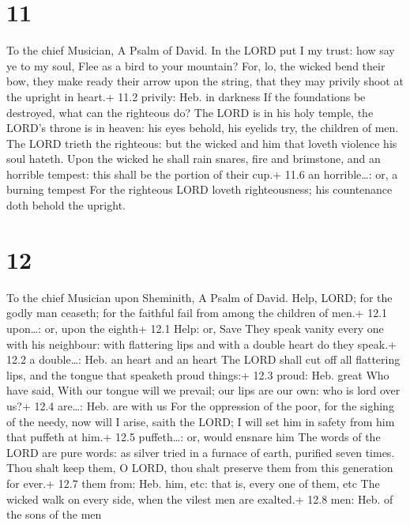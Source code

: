 \hypertarget{section-10}{%
\section{11}\label{section-10}}

To the chief Musician, A Psalm of David.  In the LORD put I
my trust: how say ye to my soul, Flee as a bird to your mountain?
 For, lo, the wicked bend their bow, they make ready their
arrow upon the string, that they may privily shoot at the upright in
heart.+ 11.2 privily: Heb. in darkness  If the foundations
be destroyed, what can the righteous do?  The LORD is in his
holy temple, the LORD's throne is in heaven: his eyes behold, his
eyelids try, the children of men.  The LORD trieth the
righteous: but the wicked and him that loveth violence his soul hateth.
 Upon the wicked he shall rain snares, fire and brimstone,
and an horrible tempest: this shall be the portion of their cup.+ 11.6
an horrible\ldots: or, a burning tempest  For the righteous
LORD loveth righteousness; his countenance doth behold the upright.

\hypertarget{section-11}{%
\section{12}\label{section-11}}

To the chief Musician upon Sheminith, A Psalm of David. 
Help, LORD; for the godly man ceaseth; for the faithful fail from among
the children of men.+ 12.1 upon\ldots: or, upon the eighth+ 12.1 Help:
or, Save  They speak vanity every one with his neighbour:
with flattering lips and with a double heart do they speak.+ 12.2 a
double\ldots: Heb. an heart and an heart  The LORD shall cut
off all flattering lips, and the tongue that speaketh proud things:+
12.3 proud: Heb. great  Who have said, With our tongue will
we prevail; our lips are our own: who is lord over us?+ 12.4 are\ldots:
Heb. are with us  For the oppression of the poor, for the
sighing of the needy, now will I arise, saith the LORD; I will set him
in safety from him that puffeth at him.+ 12.5 puffeth\ldots: or, would
ensnare him  The words of the LORD are pure words: as silver
tried in a furnace of earth, purified seven times.  Thou
shalt keep them, O LORD, thou shalt preserve them from this generation
for ever.+ 12.7 them from: Heb. him, etc: that is, every one of them,
etc  The wicked walk on every side, when the vilest men are
exalted.+ 12.8 men: Heb. of the sons of the men

